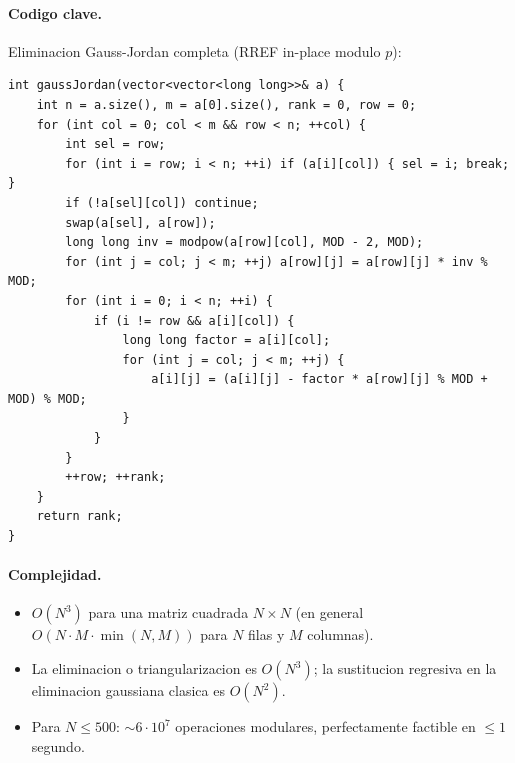 \paragraph{Codigo clave.}
Eliminacion Gauss-Jordan completa (RREF in-place modulo $p$):
\begin{verbatim}
int gaussJordan(vector<vector<long long>>& a) {
    int n = a.size(), m = a[0].size(), rank = 0, row = 0;
    for (int col = 0; col < m && row < n; ++col) {
        int sel = row;
        for (int i = row; i < n; ++i) if (a[i][col]) { sel = i; break; }
        if (!a[sel][col]) continue;
        swap(a[sel], a[row]);
        long long inv = modpow(a[row][col], MOD - 2, MOD);
        for (int j = col; j < m; ++j) a[row][j] = a[row][j] * inv % MOD;
        for (int i = 0; i < n; ++i) {
            if (i != row && a[i][col]) {
                long long factor = a[i][col];
                for (int j = col; j < m; ++j) {
                    a[i][j] = (a[i][j] - factor * a[row][j] % MOD + MOD) % MOD;
                }
            }
        }
        ++row; ++rank;
    }
    return rank;
}
\end{verbatim}

\paragraph{Complejidad.}
\begin{itemize}\setlength\itemsep{0pt}
	\item $O(N^3)$ para una matriz cuadrada $N \times N$ (en general $O(N \cdot M \cdot \min(N, M))$ para $N$ filas y $M$ columnas).
	\item La eliminacion o triangularizacion es $O(N^3)$; la sustitucion regresiva en la eliminacion gaussiana clasica es $O(N^2)$.
	\item Para $N \le 500$: $\sim 6 \cdot 10^7$ operaciones modulares, perfectamente factible en $\le 1$ segundo.
\end{itemize}

